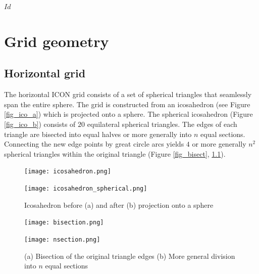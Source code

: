 \svnInfo $Id$
\chapter{Grid geometry}


\section{Horizontal grid}

The horizontal ICON grid consists of a set of spherical triangles that seamlessly span the entire sphere. The grid is constructed from an icosahedron (see Figure 
\ref{fig_ico_a}) which is projected onto a sphere. The spherical icosahedron (Figure \ref{fig_ico_b}) consists of $20$ equilateral spherical triangles. The edges of each triangle 
are bisected into equal halves or more generally into $n$ equal sections. Connecting the new edge points by great circle arcs yields $4$ or more generally $n^2$ spherical triangles 
within the original triangle (Figure \ref{fig_bisect}, \ref{fig_nsect}). 

\begin{figure}[h]
  \begin{minipage}[b]{0.4\textwidth}
    \centering
    \texttt{[image: icosahedron.png]}
    \subcaption{}\label{fig_ico_a}
  \end{minipage}\hfill
  \begin{minipage}[b]{0.4\textwidth}
    \centering
    \texttt{[image: icosahedron\_spherical.png]}
    \subcaption{}\label{fig_ico_b}
  \end{minipage}\hfill
  \caption{Icosahedron before (a) and after (b) projection onto a sphere }

\hfill

  \begin{minipage}[b]{0.4\textwidth}
    \centering
    \texttt{[image: bisection.png]}
    \subcaption{}\label{fig_bisect}
  \end{minipage}\hfill
  \begin{minipage}[b]{0.4\textwidth}
    \centering
    \texttt{[image: nsection.png]}
    \subcaption{}\label{fig_nsect}
  \end{minipage}\hfill
  \caption{(a) Bisection of the original triangle edges (b) More general division into $n$ equal sections}
\end{figure}


